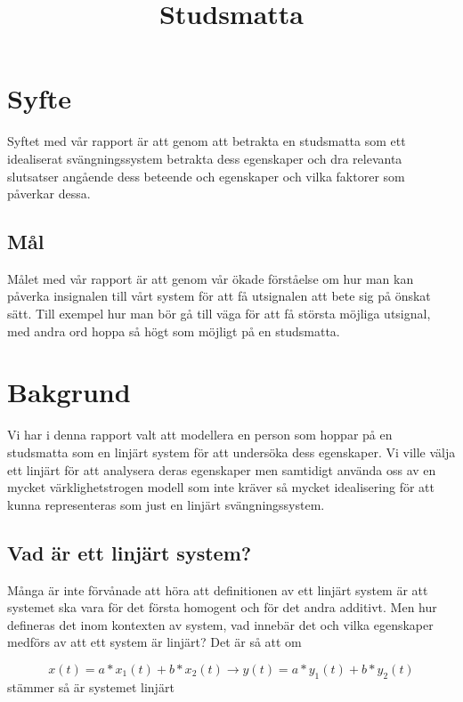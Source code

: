 \documentclass[10pt,a4paper]{article}
\begin{document}
\title{Studsmatta}
\maketitle

\tableofcontents

\section{Syfte}

Syftet med vår rapport är att genom att betrakta en studsmatta som ett idealiserat svängningssystem betrakta dess egenskaper och dra relevanta slutsatser angående dess beteende och egenskaper och vilka faktorer som påverkar dessa.

\subsection{Mål}

Målet med vår rapport är att genom vår ökade förståelse om hur man kan påverka insignalen till vårt system för att få utsignalen att bete sig på önskat sätt. Till exempel hur man bör gå till väga för att få största möjliga utsignal, med andra ord hoppa så högt som möjligt på en studsmatta.

\section{Bakgrund}

Vi har i denna rapport valt att modellera en person som hoppar på en studsmatta som en linjärt system för att undersöka dess egenskaper. Vi ville välja ett linjärt för att analysera deras egenskaper men samtidigt använda oss av en mycket värklighetstrogen modell som inte kräver så mycket idealisering för att kunna representeras som just en linjärt svängningssystem.

\subsection{Vad är ett linjärt system?}

Många är inte förvånade att höra att definitionen av ett linjärt system är att systemet ska vara för det första homogent och för det andra additivt. Men hur defineras det inom kontexten av system, vad innebär det och vilka egenskaper medförs av att ett system är linjärt? Det är så att om

\begin{equation}
x(t) = a*x_1(t) + b*x_2(t)\rightarrow y(t) = a*y_1(t) + b*y_2(t)
\end{equation}
stämmer så är systemet linjärt
\end{document}
